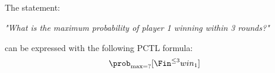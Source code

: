 \subsection{}

\subsubsection{}

The statement:
\begin{center}
	\emph{"What is the maximum probability of player 1 winning within 3 rounds?"}
\end{center}
can be expressed with the following PCTL formula:
\[
	\prob_{\max=?}[\Fin^{\le 3} win_1]
\]

\subsubsection{}

